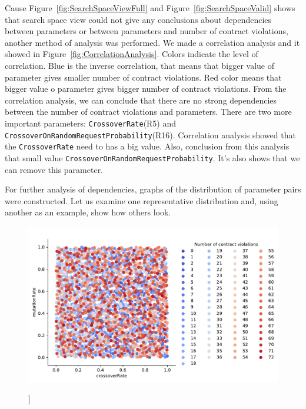 Cause Figure~\ref{fig:SearchSpaceViewFull} and Figure~\ref{fig:SearchSpaceValid} shows that search space view could not give any conclusions about dependencies between parameters or between parameters and number of contract violations, another method of analysis was performed.
We made a correlation analysis and it showed in Figure~\ref{fig:CorrelationAnalysis}. Colors indicate the level of correlation. Blue is the inverse correlation, that means that bigger value of parameter gives smaller number of contract violations. Red color means that bigger value o parameter gives bigger number of contract violations.
From the correlation analysis, we can conclude that there are no strong dependencies between the number of contract violations and parameters. There are two more important parameters: \texttt{CrossoverRate}(R5) and \texttt{CrossoverOnRandomRequestProbability}(R16).
Correlation analysis showed that the \texttt{CrossoverRate} need to has a big value. Also, conclusion from this analysis that small value  \texttt{CrossoverOnRandomRequestProbability}. It's also shows that we can remove this parameter. 

For further analysis of dependencies, graphs of the distribution of parameter pairs were constructed. Let us examine one representative distribution and, using another as an example, show how others look.

\begin{figure}
	\centering
	\includegraphics[width=\textwidth]{images/CrossoverRateVsutationRate.pdf}
	\caption[]]{}
	\label{fig:CrossoverRateVmutationRate}
\end{figure}

